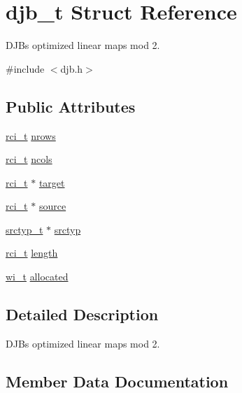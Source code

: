 \hypertarget{structdjb__t}{}\section{djb\+\_\+t Struct Reference}
\label{structdjb__t}


D\+J\+B\textquotesingle{}s optimized linear maps mod 2.  




{\ttfamily \#include $<$djb.\+h$>$}

\subsection*{Public Attributes}
\begin{DoxyCompactItemize}
\item 
\hyperlink{misc_8h_a03971b7935a6bc6fb77e74988850a136}{rci\+\_\+t} \hyperlink{structdjb__t_a2b1cd5b49a1d4b029d680281d21b1186}{nrows}
\item 
\hyperlink{misc_8h_a03971b7935a6bc6fb77e74988850a136}{rci\+\_\+t} \hyperlink{structdjb__t_a2183c4b607aa77362167d63bcd14d030}{ncols}
\item 
\hyperlink{misc_8h_a03971b7935a6bc6fb77e74988850a136}{rci\+\_\+t} $\ast$ \hyperlink{structdjb__t_adf9374605be2bbe0d61acc5ab00f75d6}{target}
\item 
\hyperlink{misc_8h_a03971b7935a6bc6fb77e74988850a136}{rci\+\_\+t} $\ast$ \hyperlink{structdjb__t_ac0aa133b6b2e76c42fc19356f77f0585}{source}
\item 
\hyperlink{djb_8h_a45879284e74072a31534206b6ecd2b2e}{srctyp\+\_\+t} $\ast$ \hyperlink{structdjb__t_aadb2d133e2306fcb6ed8492935d1cc7b}{srctyp}
\item 
\hyperlink{misc_8h_a03971b7935a6bc6fb77e74988850a136}{rci\+\_\+t} \hyperlink{structdjb__t_a0abdd28a245ac9c2366c2a8a64b86ee4}{length}
\item 
\hyperlink{misc_8h_ab3e1df9eeef59797b83f1a79851ead7e}{wi\+\_\+t} \hyperlink{structdjb__t_a3e8d52a148a10973f49bb0fd23abb8c9}{allocated}
\end{DoxyCompactItemize}


\subsection{Detailed Description}
D\+J\+B\textquotesingle{}s optimized linear maps mod 2. 

\subsection{Member Data Documentation}
\hypertarget{structdjb__t_a3e8d52a148a10973f49bb0fd23abb8c9}{}
